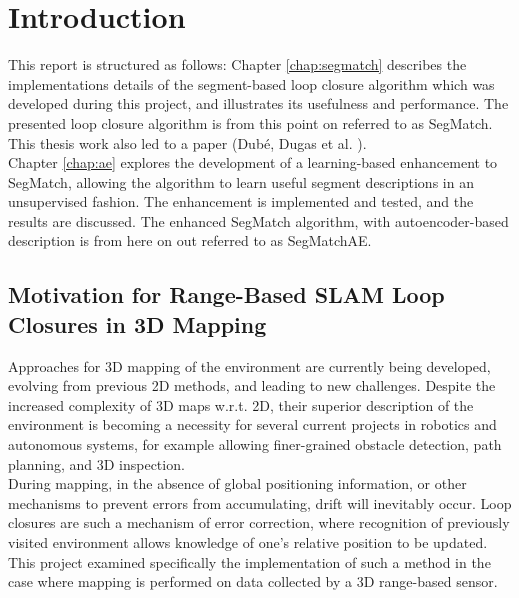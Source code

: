 \chapter{Introduction}
\label{sec:introduction}

This report is structured as follows: Chapter \ref{chap:segmatch} describes the implementations details of the segment-based loop closure algorithm which was developed during this project, and illustrates its usefulness and performance. The presented loop closure algorithm is from this point on referred to as SegMatch. This thesis work also led to a paper (Dubé, Dugas et al. \cite{segmatch}).\\

Chapter \ref{chap:ae} explores the development of a learning-based enhancement to SegMatch, allowing the algorithm to learn useful segment descriptions in an unsupervised fashion. The enhancement is implemented and tested, and the results are discussed. The enhanced SegMatch algorithm, with autoencoder-based description is from here on out referred to as SegMatchAE.\\

\section{Motivation for Range-Based SLAM Loop Closures in 3D Mapping}
\label{sec:motivation}

Approaches for 3D mapping of the environment are currently being developed, evolving from previous 2D methods, and leading to new challenges. Despite the increased complexity of 3D maps w.r.t. 2D, their superior description of the environment is becoming a necessity for several current projects in robotics and autonomous systems, for example allowing finer-grained obstacle detection, path planning, and 3D inspection.\\

During mapping, in the absence of global positioning information, or other mechanisms to prevent errors from accumulating, drift will inevitably occur. Loop closures are such a mechanism of error correction, where recognition of previously visited environment allows knowledge of one's relative position to be updated.\\ 

This project examined specifically the implementation of such a method in the case where mapping is performed on data collected by a 3D range-based sensor.\\

